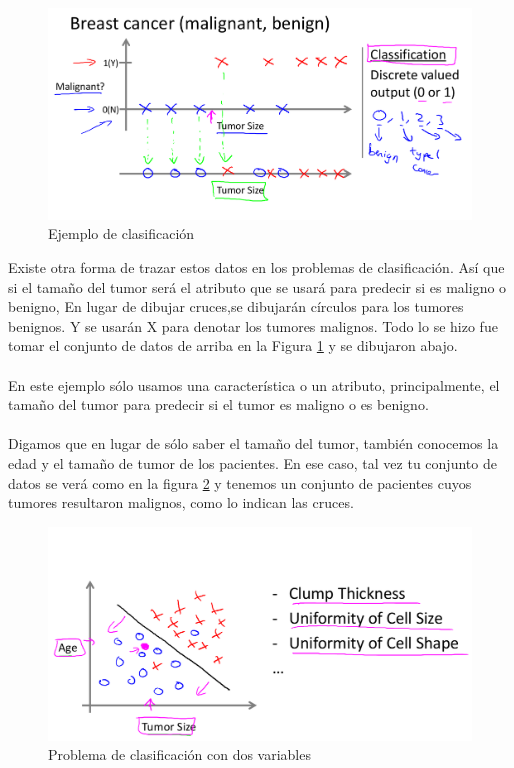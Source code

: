 \documentclass{book}
\begin{document}
\begin{figure}
	\includegraphics[scale=0.35]{img/Ej2}
	\caption{Ejemplo de clasificación}
	\label{fig:Ej2}
\end{figure}

Existe otra forma de trazar estos datos
en los problemas de clasificación.  Así que si el tamaño del tumor será
el atributo que se usará para predecir si es maligno o benigno, En lugar de dibujar cruces,se dibujarán círculos para los tumores benignos. Y se usarán X para denotar los tumores malignos. Todo lo se hizo fue tomar el conjunto de datos de arriba en la Figura \ref{fig:Ej2} y se dibujaron abajo.\\\\ En este ejemplo sólo usamos una característica o un atributo, principalmente, el tamaño del tumor para predecir si el tumor es maligno o es benigno.\\ \\

Digamos que en lugar de sólo saber el tamaño del tumor, también conocemos la
edad y el tamaño de tumor de los pacientes. En ese caso, tal vez tu conjunto de datos se verá como en la figura \ref{fig:Ej3} y tenemos un conjunto de pacientes cuyos tumores resultaron malignos, como lo indican las cruces.\\

\begin{figure}
	\includegraphics[scale=0.35]{img/Ej3}
	\caption{Problema de clasificación con dos variables}
	\label{fig:Ej3}
\end{figure}
\end{document}

